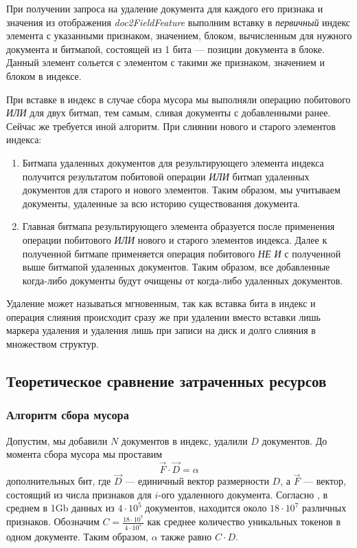 При получении запроса на удаление документа для каждого его признака и
значения из отображения \textit{doc2FieldFeature} выполним вставку в
\textit{первичный} индекс элемента с указанными признаком, значением, блоком,
вычисленным для нужного документа и битмапой, состоящей из 1 бита — позиции
документа в блоке. Данный элемент сольется с элементом с такими же признаком,
значением и блоком в индексе.

При вставке в индекс в случае сбора мусора мы выполняли операцию побитового
\textit{ИЛИ} для двух битмап, тем самым, сливая документы с добавленными ранее.
Сейчас же требуется иной алгоритм. При слиянии нового и старого элементов
индекса:
\begin{enumerate}
    \item Битмапа удаленных документов для результирующего элемента индекса
    получится результатом побитовой операции \textit{ИЛИ} битмап удаленных
    документов для старого и нового элементов. Таким образом, мы учитываем
    документы, удаленные за всю историю существования документа.
    \item Главная битмапа результирующего элемента образуется после применения
    операции побитового \textit{ИЛИ} нового и старого элементов индекса. Далее к 
    полученной битмапе применяется операция побитового \textit{НЕ И} с полученной
    выше битмапой удаленных документов. Таким образом, все добавленные когда-либо
    документы будут очищены от когда-либо удаленных документов. 
\end{enumerate}

Удаление может называться мгновенным, так как вставка бита в индекс и операция
слияния происходит сразу же при удалении вместо вставки лишь маркера удаления и
удаления лишь при записи на диск и долго слияния в множеством структур.

\subsection{Теоретическое сравнение затраченных ресурсов}

\subsubsection{Алгоритм сбора мусора}

Допустим, мы добавили $N$ документов в индекс, удалили $D$ документов.
До момента сбора мусора мы проставим
\begin{equation}
    \label{alpha}
    \vec{F} \cdot \vec{D} = \alpha
\end{equation}
дополнительных бит, где $\vec{D}$ — единичный вектор размерности $D$, 
а $\vec{F}$ — вектор, состоящий из числа признаков для $i$-ого удаленного документа.
Согласно \cite{Features:2020}, в среднем в 1Gb
данных из $4\cdot 10^5$ документов, находится около $18 \cdot 10^7$ различных
признаков. Обозначим $C = \frac{18 \cdot 10^7}{4\cdot 10^5}$ как среднее количество
уникальных токенов в одном документе. Таким образом, $\alpha$ также равно $C\cdot D$.

